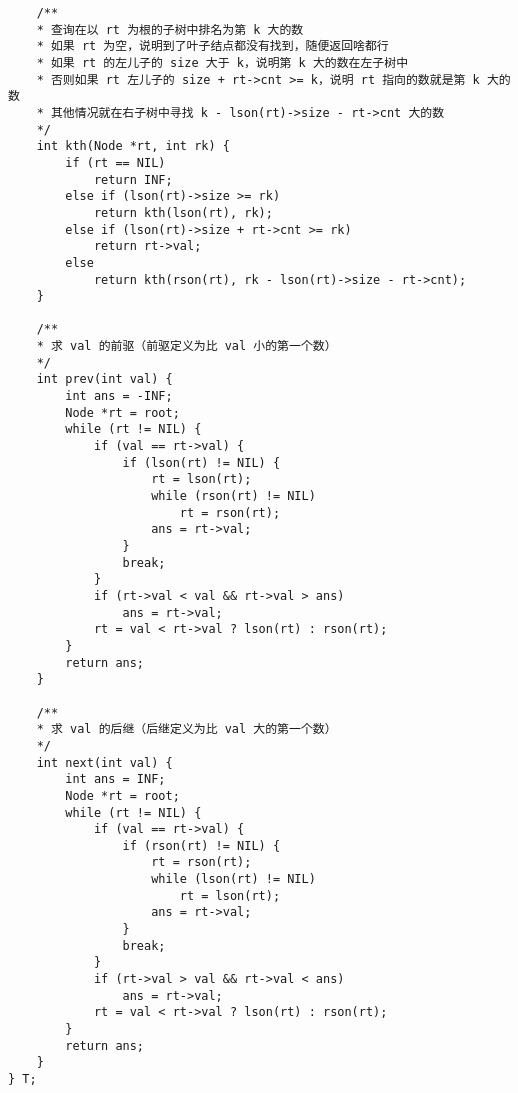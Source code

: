 \begin{verbatim}
    /**
    * 查询在以 rt 为根的子树中排名为第 k 大的数 
    * 如果 rt 为空，说明到了叶子结点都没有找到，随便返回啥都行 
    * 如果 rt 的左儿子的 size 大于 k，说明第 k 大的数在左子树中
    * 否则如果 rt 左儿子的 size + rt->cnt >= k，说明 rt 指向的数就是第 k 大的数 
    * 其他情况就在右子树中寻找 k - lson(rt)->size - rt->cnt 大的数 
    */
    int kth(Node *rt, int rk) {
        if (rt == NIL)
            return INF;
        else if (lson(rt)->size >= rk)
            return kth(lson(rt), rk);
        else if (lson(rt)->size + rt->cnt >= rk)
            return rt->val;
        else
            return kth(rson(rt), rk - lson(rt)->size - rt->cnt);
    }
    
    /**
    * 求 val 的前驱（前驱定义为比 val 小的第一个数） 
    */
    int prev(int val) {
        int ans = -INF;
        Node *rt = root;
        while (rt != NIL) {
            if (val == rt->val) {
                if (lson(rt) != NIL) {
                    rt = lson(rt);
                    while (rson(rt) != NIL)
                        rt = rson(rt);
                    ans = rt->val;
                }
                break;
            }
            if (rt->val < val && rt->val > ans)
                ans = rt->val;
            rt = val < rt->val ? lson(rt) : rson(rt);
        }
        return ans;
    }
    
    /**
    * 求 val 的后继（后继定义为比 val 大的第一个数） 
    */
    int next(int val) {
        int ans = INF;
        Node *rt = root;
        while (rt != NIL) {
            if (val == rt->val) {
                if (rson(rt) != NIL) {
                    rt = rson(rt);
                    while (lson(rt) != NIL)
                        rt = lson(rt);
                    ans = rt->val;
                }
                break;
            }
            if (rt->val > val && rt->val < ans)
                ans = rt->val;
            rt = val < rt->val ? lson(rt) : rson(rt);
        }
        return ans;
    }
} T;    
\end{verbatim}
\clearpage

